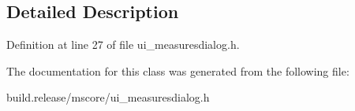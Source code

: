 \subsection{Detailed Description}


Definition at line 27 of file ui\+\_\+measuresdialog.\+h.



The documentation for this class was generated from the following file\+:\begin{DoxyCompactItemize}
\item 
build.\+release/mscore/ui\+\_\+measuresdialog.\+h\end{DoxyCompactItemize}
